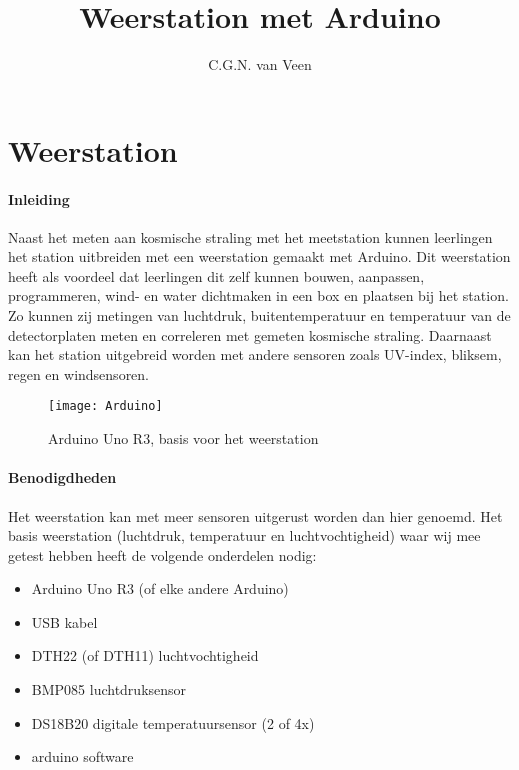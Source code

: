 

\title{Weerstation met Arduino}
\author{C.G.N. van Veen}



\maketitle

\section{Weerstation}

\paragraph{Inleiding}
Naast het meten aan kosmische straling met het \hisparc meetstation kunnen  
leerlingen het \hisparc station uitbreiden met een weerstation gemaakt met Arduino.
Dit weerstation heeft als voordeel dat leerlingen dit zelf kunnen bouwen, aanpassen,
programmeren, wind- en water dichtmaken in een box en plaatsen bij het station.
Zo kunnen zij metingen van luchtdruk, buitentemperatuur en temperatuur van de 
detectorplaten meten en correleren met gemeten kosmische straling. Daarnaast 
kan het station uitgebreid worden met andere sensoren zoals UV-index, bliksem, 
regen en windsensoren.

\begin{figure}
    \centering
    \texttt{[image: Arduino]}
    \caption{Arduino Uno R3, basis voor het weerstation}
   \label{fig:Arduino}
\end{figure}

\paragraph{Benodigdheden}
Het weerstation kan met meer sensoren uitgerust worden dan hier genoemd.
Het basis weerstation (luchtdruk, temperatuur en luchtvochtigheid) waar wij mee
getest hebben heeft de volgende onderdelen nodig: \\
\begin{itemize}
    \item Arduino Uno R3 (of elke andere Arduino)
    \item USB kabel
    \item DTH22 (of DTH11) luchtvochtigheid
    \item BMP085 luchtdruksensor
    \item DS18B20 digitale temperatuursensor (2 of 4x)
    \item arduino software
\end{itemize}

